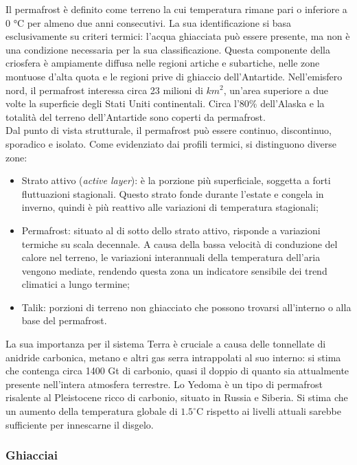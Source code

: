 \documentclass[a4paper,12pt]{book}
\begin{document}
Il permafrost è definito come terreno la cui temperatura rimane pari o inferiore a 0 °C per almeno due anni consecutivi.
La sua identificazione si basa esclusivamente su criteri termici: l'acqua ghiacciata può essere presente, ma non è una condizione necessaria per la sua classificazione.
Questa componente della criosfera è ampiamente diffusa nelle regioni artiche e subartiche, nelle zone montuose d'alta quota e le regioni prive di ghiaccio dell'Antartide.
Nell'emisfero nord, il permafrost interessa circa 23 milioni di $km^2$, un'area superiore a due volte la superficie degli Stati Uniti continentali.
Circa l'80\% dell'Alaska e la totalità del terreno dell'Antartide sono coperti da permafrost.\\

\noindent
Dal punto di vista strutturale, il permafrost può essere continuo, discontinuo, sporadico e isolato.
Come evidenziato dai profili termici, si distinguono diverse zone:

\begin{itemize}
    \item Strato attivo (\textit{active layer}): è la porzione più superficiale, soggetta a forti fluttuazioni stagionali. Questo strato fonde durante l'estate e congela in inverno, quindi è più reattivo alle variazioni di temperatura stagionali;
    \item Permafrost: situato al di sotto dello strato attivo, risponde a variazioni termiche su scala decennale. A causa della bassa velocità di conduzione del calore nel terreno, le variazioni interannuali della temperatura dell'aria vengono mediate, rendendo questa zona un indicatore sensibile dei trend climatici a lungo termine;
    \item Talik: porzioni di terreno non ghiacciato che possono trovarsi all'interno o alla base del permafrost.
\end{itemize}

\noindent
La sua importanza per il sistema Terra è cruciale a causa delle tonnellate di anidride carbonica, metano e altri gas serra intrappolati al suo interno:
si stima che contenga circa 1400 Gt di carbonio, quasi il doppio di quanto sia attualmente presente nell'intera atmosfera terrestre.
Lo Yedoma è un tipo di permafrost risalente al Pleistocene ricco di carbonio, situato in Russia e Siberia. Si stima che un aumento della temperatura globale di $1.5^\circ$C rispetto ai livelli attuali sarebbe sufficiente per innescarne il disgelo.

\subsubsection{\textcolor{colore2}{Ghiacciai}}
\end{document}
